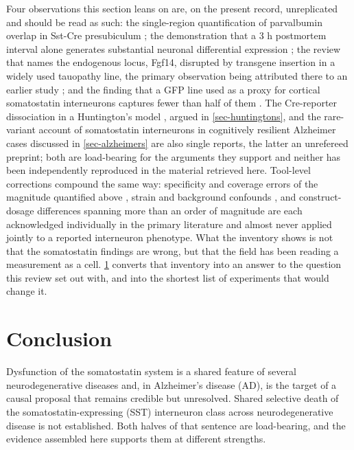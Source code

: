\documentclass[11pt]{article}
\begin{document}
Four observations this section leans on are, on the present record, unreplicated and should be read as such: the single-region quantification of parvalbumin overlap in Sst-Cre presubiculum \citep{Nassar2015}; the demonstration that a 3 h postmortem interval alone generates substantial neuronal differential expression \citep{Olney2025}; the review that names the endogenous locus, Fgf14, disrupted by transgene insertion in a widely used tauopathy line, the primary observation being attributed there to an earlier study \citep{Sahara2023}; and the finding that a GFP line used as a proxy for cortical somatostatin interneurons captures fewer than half of them \citep{Zhou2019}. The Cre-reporter dissociation in a Huntington's model \citep{Voelkl2022}, argued in \ref{sec-huntingtons}, and the rare-variant account of somatostatin interneurons in cognitively resilient Alzheimer cases discussed in \ref{sec-alzheimers} are also single reports, the latter an unrefereed preprint; both are load-bearing for the arguments they support and neither has been independently reproduced in the material retrieved here. Tool-level corrections compound the same way: specificity and coverage errors of the magnitude quantified above \citep{MullerKomorowska2020,Zhou2019}, strain and background confounds \citep{Foss2024,Bhaduri2018}, and construct-dosage differences spanning more than an order of magnitude \citep{Guo2013,Sahara2023,Yeapuri2025} are each acknowledged individually in the primary literature and almost never applied jointly to a reported interneuron phenotype. What the inventory shows is not that the somatostatin findings are wrong, but that the field has been reading a measurement as a cell. \ref{sec-conclusion} converts that inventory into an answer to the question this review set out with, and into the shortest list of experiments that would change it.

\section{Conclusion}
\label{sec-conclusion}

Dysfunction of the somatostatin system is a shared feature of several neurodegenerative diseases and, in Alzheimer's disease (AD), is the target of a causal proposal that remains credible but unresolved. Shared selective death of the somatostatin-expressing (SST) interneuron class across neurodegenerative disease is not established. Both halves of that sentence are load-bearing, and the evidence assembled here supports them at different strengths.
\end{document}
